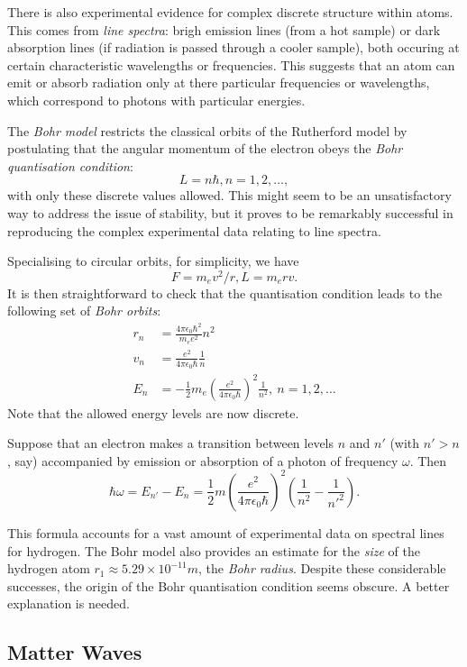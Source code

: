 \documentclass[a4paper]{article}
\begin{document}
There is also experimental evidence for complex discrete structure within atoms. This comes from \emph{line spectra}: brigh emission lines (from a hot sample) or dark absorption lines (if radiation is passed through a cooler sample), both occuring at certain characteristic wavelengths or frequencies. This suggests that an atom can emit or absorb radiation only at there particular frequencies or wavelengths, which correspond to photons with particular energies.

The \emph{Bohr model} restricts the classical orbits of the Rutherford model by postulating that the angular momentum of the electron obeys the \emph{Bohr quantisation condition}:
\[
  L = n\hbar, n=1,2,\ldots,
\]
with only these discrete values allowed. This might seem to be an unsatisfactory way to address the issue of stability, but it proves to be remarkably successful in reproducing the complex experimental data relating to line spectra.

Specialising to circular orbits, for simplicity, we have
\[
  F=m_e v^2/r, L=m_e rv.
\]
It is then straightforward to check that the quantisation condition leads to the following set of \emph{Bohr orbits}:
\begin{align*}
  r_n &= \frac{4\pi\epsilon_0\hbar^2}{m_e e^2}n^2 \\
  v_n &= \frac{e^2}{4\pi\epsilon_0\hbar}\frac{1}{n} \\
  E_n &= -\frac{1}{2}m_e (\frac{e^2}{4\pi\epsilon_0\hbar})^2\frac{1}{n^2},\: n =1,2,\ldots
\end{align*}
Note that the allowed energy levels are now discrete.

Suppose that an electron makes a transition between levels $n$ and $n'$ (with $n' > n$, say) accompanied by emission or absorption of a photon of frequency $\omega$. Then
\[
  \hbar\omega = E_{n'} - E_n = \frac{1}{2}m(\frac{e^2}{4\pi\epsilon_0\hbar})^2 (\frac{1}{n^2} - \frac{1}{n'^2}).
\]

This formula accounts for a vast amount of experimental data on spectral lines for hydrogen. The Bohr model also provides an estimate for the \emph{size} of the hydrogen atom $r_1 \approx 5.29\times 10^{-11} m$, the \emph{Bohr radius}. Despite these considerable successes, the origin of the Bohr quantisation condition seems obscure. A better explanation is needed.

\subsection{Matter Waves}
\end{document}
